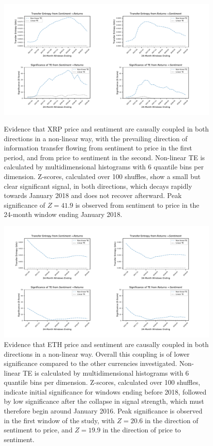 \documentclass[]{rsos}%
\begin{document}
  \begin{figure}[!htbp]
    \includegraphics[width=\linewidth]{images/XRP.pdf}
    \caption{Evidence that XRP price and sentiment are causally coupled in both directions in a non-linear way, with the prevailing direction of information transfer flowing from sentiment to price in the first period, and from price to sentiment in the second. Non-linear TE is calculated by multidimensional histograms with 6 quantile bins per dimension. Z-scores, calculated over 100 shuffles, show a small but clear significant signal, in both directions, which decays rapidly towards January 2018 and does not recover afterward. Peak significance of $Z=41.9$ is observed from sentiment to price in the 24-month window ending January 2018.}
    \label{fig:XRP_TE}

    \includegraphics[width=\linewidth]{images/ETH.pdf} 
    \caption{Evidence that ETH price and sentiment are causally coupled in both directions in a non-linear way. Overall this coupling is of lower significance compared to the other currencies investigated. Non-linear TE is calculated by multidimensional histograms with 6 quantile bins per dimension. Z-scores, calculated over 100 shuffles, indicate initial significance for windows ending before 2018, followed by low significance after the collapse in signal strength, which must therefore begin around January 2016. Peak significance is observed in the first window of the study, with $Z=20.6$ in the direction of sentiment to price, and $Z=19.9$ in the direction of price to sentiment.     
  }
  \label{fig:ETH_TE}
  \vspace{-34pt}
  \end{figure}
  
\end{document}
